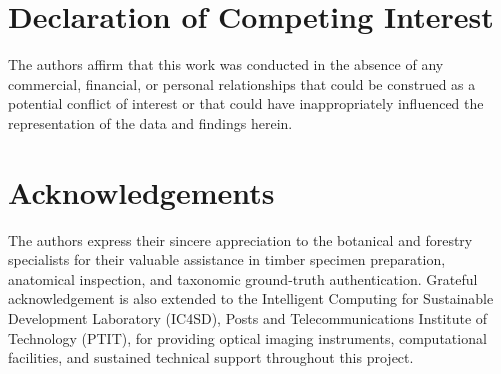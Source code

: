 \documentclass[a4paper,fleqn,12pt]{cas-sc}
\begin{document}
\section*{Declaration of Competing Interest}

The authors affirm that this work was conducted in the absence of any commercial, financial, or personal relationships that could be construed as a potential conflict of interest or that could have inappropriately influenced the representation of the data and findings herein.

\section*{Acknowledgements}

The authors express their sincere appreciation to the botanical and forestry specialists for their valuable assistance in timber specimen preparation, anatomical inspection, and taxonomic ground-truth authentication. Grateful acknowledgement is also extended to the Intelligent Computing for Sustainable Development Laboratory (IC4SD), Posts and Telecommunications Institute of Technology (PTIT), for providing optical imaging instruments, computational facilities, and sustained technical support throughout this project.



\end{document}
